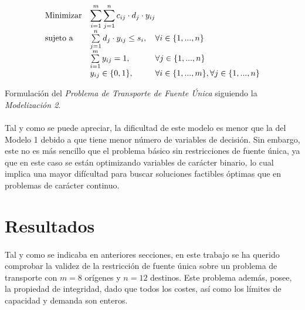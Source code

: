 \documentclass[a4paper, spanish]{article}
\begin{document}
      \begin{eqfloat}
        \begin{equation}
          \begin{array}{ll@{}ll}
            \text{Minimizar}	& \displaystyle \sum\limits_{i=1}^{m}\sum\limits_{j=1}^{n}c_{ij} \cdot d_{j} \cdot y_{ij} \\
            \text{sujeto a}		& \sum\limits_{j=1}^{n} d_{j} \cdot y_{ij}	\leq s_{i}, & \forall i \in \{1,...,n\}\\
                              &	\sum\limits_{i=1}^{m} y_{ij}	= 1, & \forall j \in \{1,...,n\} \\
                              & y_{ij}	\in \{0, 1\}, 	& \forall i \in \{1,...,m\}, \forall j \in \{1,...,n\}
          \end{array}
        \end{equation}
        \caption{Formulación del \emph{Problema de Transporte de Fuente Única} siguiendo la \emph{Modelización 2}.}
        \label{eq:single-source-transportation-model-2}
      \end{eqfloat}

      \paragraph{}
      Tal y como se puede apreciar, la dificultad de este modelo es menor que la del Modelo 1 debido a que tiene menor número de variables de decisión. Sin embargo, este no es más sencillo que el problema básico sin restricciones de fuente única, ya que en este caso se están optimizando variables de carácter binario, lo cual implica una mayor difícultad para buscar soluciones factibles óptimas que en problemas de carácter continuo.

  \section{Resultados}
  \label{sec:results}

    \paragraph{}
    Tal y como se indicaba en anteriores secciones, en este trabajo se ha querido comprobar la validez de la restricción de fuente única sobre un problema de transporte con $m = 8$ orígenes y $n = 12$ destinos. Este problema además, posee, la propiedad de integridad, dado que todos los costes, así como los límites de capacidad y demanda son enteros.
\end{document}
